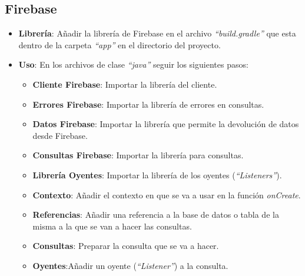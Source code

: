 	\subsection{Firebase}
		\begin{itemize}
			\item {\bf Librería}: Añadir la librería de Firebase en el archivo {\it ``build.gradle''} que esta dentro de la carpeta {\it ``app''} en el directorio del proyecto.
			\item {\bf Uso}: En los archivos de clase {\it ``java''}\cite{14:java:online} seguir los siguientes pasos:
				\begin{itemize}
					\item {\bf Cliente Firebase}: Importar la librería del cliente.
					\item {\bf Errores Firebase}: Importar la librería de errores en consultas.
					\item {\bf Datos Firebase}: Importar la librería que permite la devolución de datos desde Firebase.
					\item {\bf Consultas Firebase}: Importar la librería para consultas.
					\item {\bf Librería Oyentes}: Importar la librería de los oyentes ({\it ``Listeners''}).
					\item {\bf Contexto}: Añadir el contexto en que se va a usar en la función {\it onCreate}.
					\item {\bf Referencias}: Añadir una referencia a la base de datos o tabla de la misma a la que se van a hacer las consultas.
					\item {\bf Consultas}: Preparar la consulta que se va a hacer.
					\item {\bf Oyentes}:Añadir un oyente ({\it ``Listener''}) a la consulta.
				\end{itemize}
		\end{itemize}
		
		